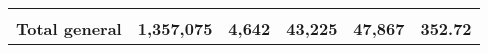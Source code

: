 \begin{tabular}{lrcclr}
	& \multicolumn{1}{l}{}                                           & \multicolumn{1}{l}{}                                       & \multicolumn{1}{l}{} &                                                                     & \multicolumn{1}{l}{}                                                         \\
	\rowcolor[HTML]{DDEBF7} 
	\textbf{Total   general}                                       & \textbf{1,357,075}                                             & \multicolumn{1}{r}{\cellcolor[HTML]{DDEBF7}\textbf{4,642}} & \textbf{43,225}      & \textbf{47,867}                                                     & \textbf{352.72}                                                             
\end{tabular}